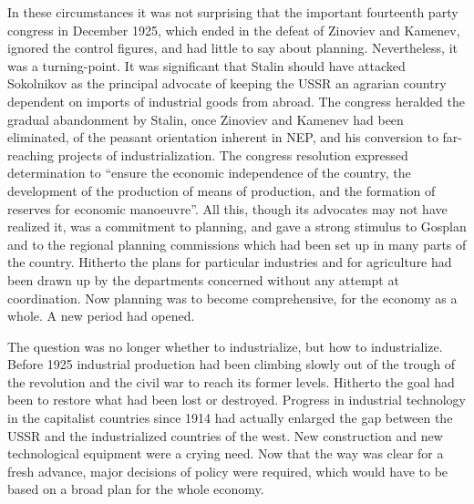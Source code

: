In these circumstances it was not surprising that the important fourteenth party congress in December 1925, which ended in the defeat of Zinoviev and Kamenev, ignored the control figures, and had little to say about planning. Nevertheless, it was a turning-point. It was significant that Stalin should have attacked Sokolnikov as the principal advocate of keeping the USSR an agrarian country dependent on imports of industrial goods from abroad. The congress heralded the gradual abandonment by Stalin, once Zinoviev and Kamenev had been eliminated, of the peasant orientation inherent in NEP, and his conversion to far-reaching projects of industrialization. The congress resolution expressed determination to ``ensure the economic independence of the country, the development of the production of means of production, and the formation of reserves for economic manoeuvre''. All this, though its advocates may not have realized it, was a commitment to planning, and gave a strong stimulus to Gosplan and to the regional planning commissions which had been set up in many parts of the country. Hitherto the plans for particular industries and for agriculture had been drawn up by the departments concerned without any attempt at coordination. Now planning was to become comprehensive, for the economy as a whole. A new period had opened. 

The question was no longer whether to industrialize, but how to industrialize. Before 1925 industrial production had been climbing slowly out of the trough of the revolution and the civil war to reach its former levels. Hitherto the goal had been to restore what had been lost or destroyed. Progress in industrial technology in the capitalist countries since 1914 had actually enlarged the gap between the USSR and the industrialized countries of the west. New construction and new technological equipment were a crying need. Now that the way was clear for a fresh advance, major decisions of policy were required, which would have to be based on a broad plan for the whole economy. 

